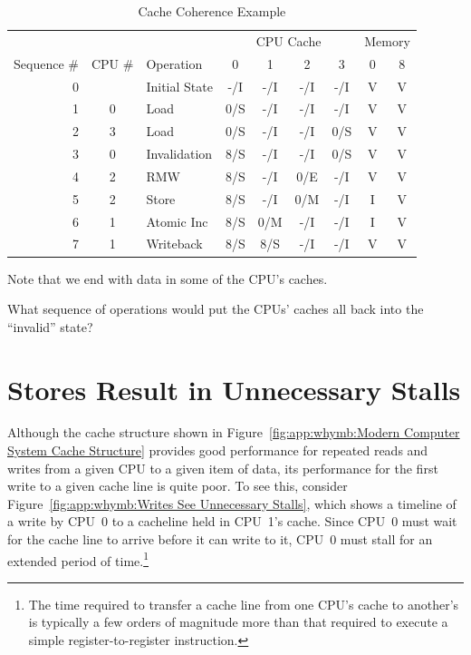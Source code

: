 \begin{table}
\small
\begin{center}
\begin{tabular}{r|c|l||c|c|c|c||c|c}
	& & & \multicolumn{4}{c||}{CPU Cache} & \multicolumn{2}{c}{Memory} \\
	\cline{4-7}
	Sequence \# & CPU \# & Operation & 0 & 1 & 2 & 3 & 0 & 8 \\
	\hline
	\hline
	0 &   & Initial State	& -/I & -/I & -/I & -/I   & V & V \\
	\hline
	1 & 0 & Load		& 0/S & -/I & -/I & -/I   & V & V \\
	\hline
	2 & 3 & Load		& 0/S & -/I & -/I & 0/S   & V & V \\
	\hline
	3 & 0 & Invalidation	& 8/S & -/I & -/I & 0/S   & V & V \\
	\hline
	4 & 2 & RMW		& 8/S & -/I & 0/E & -/I   & V & V \\
	\hline
	5 & 2 & Store		& 8/S & -/I & 0/M & -/I   & I & V \\
	\hline
	6 & 1 & Atomic Inc	& 8/S & 0/M & -/I & -/I   & I & V \\
	\hline
	7 & 1 & Writeback	& 8/S & 8/S & -/I & -/I   & V & V \\
\end{tabular}
\end{center}
\caption{Cache Coherence Example}
\label{tab:app:whymb:Cache Coherence Example}
\end{table}

Note that we end with data in some of the CPU's caches.

\QuickQuiz{}
	What sequence of operations would put the CPUs' caches
	all back into the ``invalid'' state?
 \QuickQuizEnd

\section{Stores Result in Unnecessary Stalls}
\label{sec:app:whymb:Stores Result in Unnecessary Stalls}

Although the cache structure shown in
Figure~\ref{fig:app:whymb:Modern Computer System Cache Structure}
provides good performance for repeated reads and writes from a given CPU
to a given item of data, its performance for the first write to
a given cache line is quite poor.
To see this, consider
Figure~\ref{fig:app:whymb:Writes See Unnecessary Stalls},
which shows a timeline of a write by CPU~0 to a cacheline held in
CPU~1's cache.
Since CPU~0 must wait for the cache line to arrive before it can
write to it, CPU~0 must stall for an extended period of time.\footnote{
	The time required to transfer a cache line from one CPU's cache
	to another's is typically a few orders of magnitude more than
	that required to execute a simple register-to-register instruction.}

